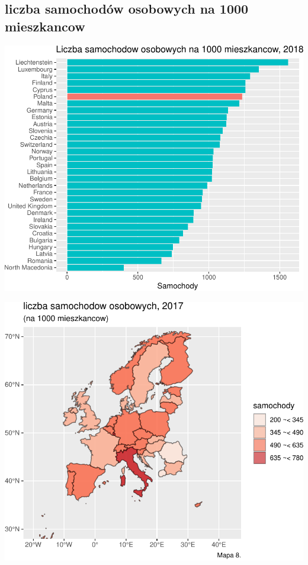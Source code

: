 \documentclass[
]{article}
\begin{document}
\hypertarget{liczba-samochoduxf3w-osobowych-na-1000-mieszkancow}{%
\subsection{liczba samochodów osobowych na 1000
mieszkancow}\label{liczba-samochoduxf3w-osobowych-na-1000-mieszkancow}}

\begin{flushleft}\includegraphics{raport_wypadki_files/figure-latex/unnamed-chunk-31-1} \end{flushleft}

\begin{flushleft}\includegraphics{raport_wypadki_files/figure-latex/unnamed-chunk-31-2} \end{flushleft}
\end{document}
